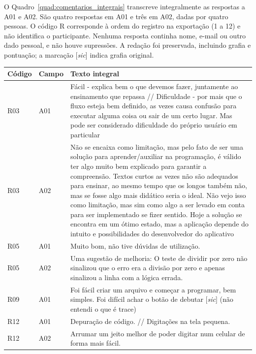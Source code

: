 O Quadro~\ref{quad:comentarios_integrais} transcreve integralmente as respostas a A01
e A02. São quatro respostas em A01 e três em A02, dadas por quatro pessoas. O código
R corresponde à ordem do registro na exportação (1 a 12) e não identifica o
participante. Nenhuma resposta continha nome, e-mail ou outro dado pessoal, e não
houve supressões. A redação foi preservada, incluindo grafia e pontuação; a
marcação [\textit{sic}] indica grafia original.

\begin{quadro}[htb]
\centering
{}
\footnotesize
\begin{tabular}{|P{1.1cm}|P{1.0cm}|P{10.6cm}|}
\hline
Código & Campo & Texto integral \\
\hline\hline
R03 & A01 & Fácil - explica bem o que devemos fazer, juntamente ao ensinamento que
repassa // Dificuldade - por mais que o fluxo esteja bem definido, as vezes causa
confusão para executar alguma coisa ou sair de um certo lugar. Mas pode ser
considerado dificuldade do próprio usuário em particular \\
\hline
R03 & A02 & Não se encaixa como limitação, mas pelo fato de ser uma solução para
aprender/auxiliar na programação, é válido ter algo muito bem explicado para
garantir a compreensão. Textos curtos as vezes não são adequados para ensinar, ao
mesmo tempo que os longos também não, mas se fosse algo mais didático seria o ideal.
Não vejo isso como limitação, mas sim como algo a ser levado em conta para ser
implementado se fizer sentido. Hoje a solução se encontra em um ótimo estado, mas a
aplicação depende do intuito e possibilidades do desenvolvedor do aplicativo \\
\hline
R05 & A01 & Muito bom, não tive dúvidas de utilização. \\
\hline
R05 & A02 & Uma sugestão de melhoria: O teste de dividir por zero não sinalizou que o
erro era a divisão por zero e apenas sinalizou a linha com a lógica errada. \\
\hline
R09 & A01 & Foi fácil criar um arquivo e começar a programar, bem simples. Foi
difícil achar o botão de debutar [\textit{sic}] (não entendi o que é trace) \\
\hline
R12 & A01 & Depuração de código. // Digitações na tela pequena. \\
\hline
R12 & A02 & Arrumar um jeito melhor de poder digitar num celular de forma mais fácil. \\
\hline
\end{tabular}
\vspace{0.2cm}
\end{quadro}
\FloatBarrier
